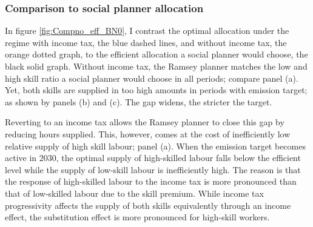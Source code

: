 %
 
\subsubsection{Comparison to social planner allocation}\label{subsub:compeff}


In figure \ref{fig:Compno_eff_BN0}, I contrast the optimal allocation under the regime with income tax, the blue dashed lines, and without income tax, the orange dotted graph, to the efficient allocation  a social planner would choose, the black solid graph. 
Without income tax, the Ramsey planner matches the low and high skill ratio a social planner would choose in all periods; compare panel (a). Yet, both skills are supplied in too high amounts in periods with emission target; as shown by panels (b) and (c). The gap widens, the stricter the target. 

Reverting to an income tax allows the Ramsey planner to close this gap by reducing hours supplied. This, however, comes at the cost of inefficiently low relative supply of high skill labour; panel (a). When the emission target becomes active in 2030, the optimal supply of high-skilled labour falls below the efficient level while the supply of low-skill labour is inefficiently high. The reason is that the response of high-skilled labour to the income tax is more pronounced than that of low-skilled labour due to the skill premium. While income tax progressivity affects the supply of both skills equivalently through an income effect, the substitution effect is more pronounced for high-skill workers.

